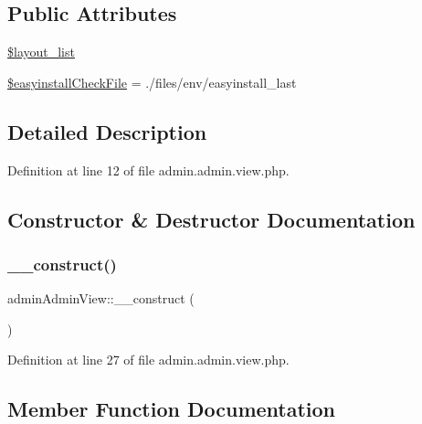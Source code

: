 \subsection*{Public Attributes}
\begin{DoxyCompactItemize}
\item 
\hyperlink{classadminAdminView_a3655428ad4a88938daaa0a44c1ff96ea}{\$layout\+\_\+list}
\item 
\hyperlink{classadminAdminView_a3cfff18fed688e8cf67f4f8bbba79abf}{\$easyinstall\+Check\+File} = \textquotesingle{}./files/env/easyinstall\+\_\+last\textquotesingle{}
\end{DoxyCompactItemize}


\subsection{Detailed Description}


Definition at line 12 of file admin.\+admin.\+view.\+php.



\subsection{Constructor \& Destructor Documentation}
\mbox{\label{classadminAdminView_a8bf927cf8a3c6554d083a29f90a8e3eb}} 
\subsubsection{\texorpdfstring{\+\_\+\+\_\+construct()}{\_\_construct()}}
{\footnotesize\ttfamily admin\+Admin\+View\+::\+\_\+\+\_\+construct (\begin{DoxyParamCaption}{ }\end{DoxyParamCaption})}



Definition at line 27 of file admin.\+admin.\+view.\+php.



\subsection{Member Function Documentation}
\mbox{\label{classadminAdminView_ad1fe5e140900ad8f5814871ed6ae9508}} 
